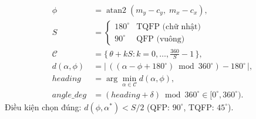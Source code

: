 \documentclass[12pt,a4paper]{article}
\newcommand{\atantwo}{\operatorname{atan2}}
\begin{document}
\[
\begin{aligned}
\phi &= \atantwo(m_y - c_y,\; m_x - c_x), \\[3pt]
S &= \begin{cases} 180^\circ & \text{TQFP (chữ nhật)}\\ 90^\circ & \text{QFP (vuông)} \end{cases} \\[3pt]
\mathcal{C} &= \{\, \theta + kS : k = 0,\dots, \tfrac{360}{S}-1 \,\}, \\[3pt]
d(\alpha,\phi) &= \bigl|\, ((\alpha - \phi + 180^\circ)\bmod 360^\circ) - 180^\circ \,\bigr|, \\[3pt]
heading &= \arg\min_{\alpha \in \mathcal{C}} d(\alpha,\phi), \\[3pt]
angle\_deg &= (heading + \delta) \bmod 360^\circ \in [0^\circ, 360^\circ).
\end{aligned}
\]
Điều kiện chọn đúng: $d(\phi, \alpha^\ast) < S/2$ \;(QFP: $90^\circ$, TQFP: $45^\circ$).
\end{document}
